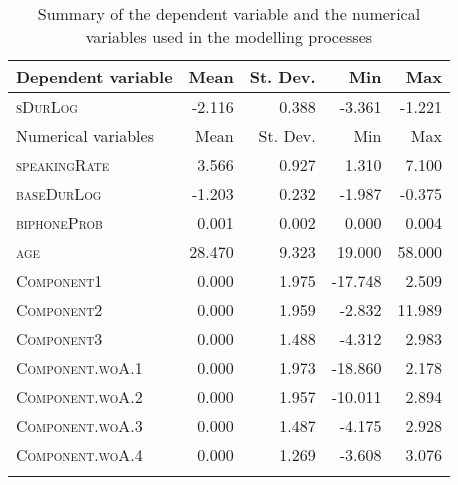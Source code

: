 \begin{table}\fontsize{10}{11}
\caption{Summary of the dependent variable and the numerical variables used in the modelling processes}
\label{tab:5.2}
\centering
\begin{tabular}{lrrrr} 
\lsptoprule
Dependent variable  & Mean   & St. Dev. & Min     & Max     \\ 
\midrule
\textsc{sDurLog}             & -2.116 & 0.388    & -3.361  & -1.221  \\ 
\midrule
Numerical variables & Mean   & St. Dev. & Min     & Max     \\ 
\midrule
\textsc{speakingRate}        & 3.566  & 0.927    & 1.310   & 7.100   \\
\textsc{baseDurLog}          & -1.203 & 0.232    & -1.987  & -0.375  \\
\textsc{biphoneProb}         & 0.001  & 0.002    & 0.000   & 0.004   \\
\textsc{age}                 & 28.470 & 9.323    & 19.000  & 58.000  \\
\textsc{Component1}          & 0.000  & 1.975    & -17.748 & 2.509   \\
\textsc{Component2}          & 0.000  & 1.959    & -2.832  & 11.989  \\
\textsc{Component3}          & 0.000  & 1.488    & -4.312  & 2.983   \\
\textsc{Component.woA.1}     & 0.000  & 1.973    & -18.860 & 2.178   \\
\textsc{Component.woA.2}     & 0.000  & 1.957    & -10.011 & 2.894   \\
\textsc{Component.woA.3}     & 0.000  & 1.487    & -4.175  & 2.928   \\
\textsc{Component.woA.4}     & 0.000  & 1.269    & -3.608  & 3.076   \\
\lspbottomrule
\end{tabular}
\end{table}



